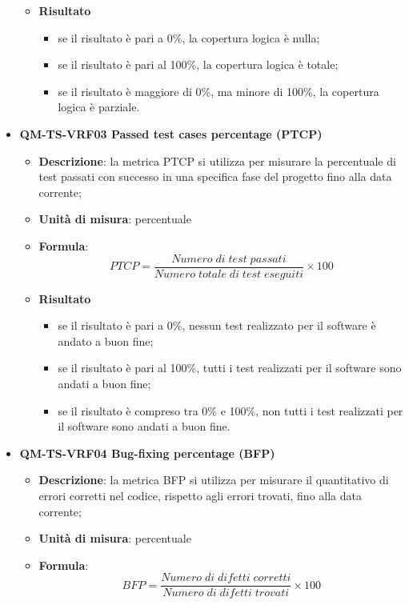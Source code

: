 \begin{itemize}
\begin{itemize}
							\item\textbf{Risultato}
								\begin{itemize}
									\item se il risultato è pari a 0\%, la copertura logica è nulla;
									\item se il risultato è pari al 100\%, la copertura logica  è totale;
									\item se il risultato è maggiore di 0\%, ma minore di 100\%, la copertura logica è parziale.
								\end{itemize}
						\end{itemize}
					\item\textbf{QM-TS-VRF03 Passed test cases percentage (PTCP)}
						\begin{itemize}
							\item\textbf{Descrizione}: la metrica PTCP si utilizza per misurare la percentuale di test passati con successo in una specifica fase del progetto fino alla data corrente;
							\item\textbf{Unità di misura}: percentuale
							\item\textbf{Formula}: 
								\[ PTCP = \frac{\mathit{Numero\;di\;test\;passati}}{\mathit{Numero\;totale\;di\;test\;eseguiti}} \times 100 \]
							\item\textbf{Risultato}
								\begin{itemize}
									\item se il risultato è pari a 0\%, nessun test realizzato per il software è andato a buon fine;
									\item se il risultato è pari al 100\%, tutti i test realizzati per il software sono andati a buon fine;
									\item se il risultato è compreso tra 0\% e 100\%, non tutti i test realizzati per il software sono andati a buon fine.
								\end{itemize}
						\end{itemize}
					\item\textbf{QM-TS-VRF04 Bug-fixing percentage (BFP)}
						\begin{itemize}
							\item\textbf{Descrizione}: la metrica BFP si utilizza per misurare il quantitativo di errori corretti nel codice, rispetto agli errori trovati, fino alla data corrente;
							\item\textbf{Unità di misura}: percentuale
							\item\textbf{Formula}: 
								\[ BFP = \frac{\mathit{Numero\;di\;difetti\;corretti}}{\mathit{Numero\;di\;difetti\;trovati}} \times 100 \]

\end{itemize}
\end{itemize}
